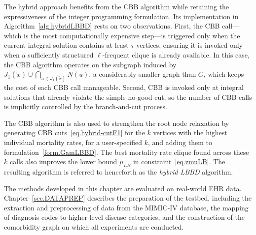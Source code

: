\begin{algorithm}[htbp]
\caption{Hybrid Logic-Based Benders Decomposition: Separation
Procedure}
\label{alg.hybridLBBD}
\end{algorithm}

The hybrid approach benefits from the CBB algorithm while retaining
the expressiveness of the integer programming formulation. Its
implementation in Algorithm~\ref{alg.hybridLBBD} rests on two
observations. First, the CBB call---which is the most computationally
expensive step---is triggered only when the current integral solution
contains at least $\tau$ vertices, ensuring it is invoked only when a
sufficiently structured $\ell$-frequent clique is already available.
In this case, the CBB algorithm operates on the subgraph induced by
$J_1(\widetilde{x}) \cup \bigcap_{u \in J_1(\widetilde{x})} N(u)$,
a considerably smaller graph than $G$, which keeps the cost of each
CBB call manageable. Second, CBB is invoked only at integral solutions
that already violate the simple no-good cut, so the number of CBB
calls is implicitly controlled by the branch-and-cut process.

The CBB algorithm is also used to strengthen the root node relaxation
by generating CBB cuts~\eqref{eq.hybrid-cutF1} for the $k$ vertices
with the highest individual mortality rates, for a user-specified $k$,
and adding them to formulation~\eqref{form.GamLBBD}. The best
mortality rate clique found across these $k$ calls also improves the
lower bound $\mu_{LB}$ in constraint~\eqref{eq.zmuLB}. The resulting
algorithm is referred to henceforth as the \textit{hybrid LBBD}
algorithm.

The methods developed in this chapter are evaluated on real-world EHR
data. Chapter~\ref{sec.DATAPREP} describes the preparation of the testbed,
including the extraction and preprocessing of data from the MIMIC-IV
database, the mapping of diagnosis codes to higher-level disease
categories, and the construction of the comorbidity graph on which all
experiments are conducted.